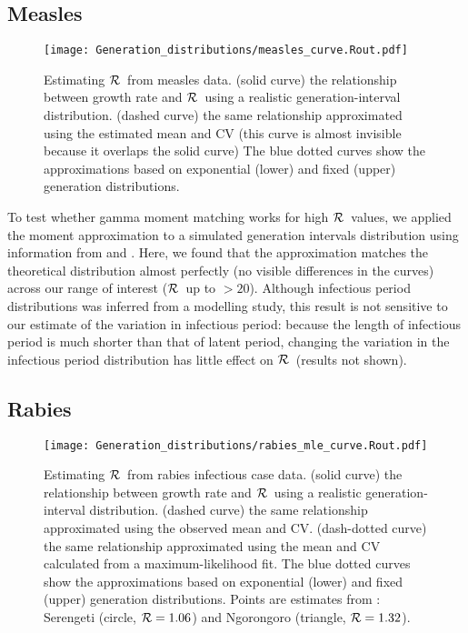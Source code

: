 \documentclass[12pt]{article}
\newcommand{\RR}{\ensuremath{{\cal R}}}
\begin{document}
\subsection{Measles}

\begin{figure}[htbp] \centering
	\texttt{[image: Generation\_distributions/measles\_curve.Rout.pdf]}
	\caption{Estimating \RR~from measles data.
		(solid curve) the relationship between growth rate and \RR~using a realistic generation-interval distribution.
		(dashed curve) the same relationship approximated using the estimated mean and CV (this curve is almost invisible because it overlaps the solid curve)
		The blue dotted curves show the approximations based on exponential (lower) and fixed (upper) generation distributions.
	}
	\label{fig:measlesCurve}
\end{figure}

To test whether gamma moment matching works for high \RR\ values, we applied the moment approximation to a simulated generation intervals distribution using information from \cite{LessReic09} and \cite{Lloy01}. 
Here, we found that the approximation matches the theoretical distribution almost perfectly (no visible differences in the curves) across our range of interest (\RR\ up to $>20$).
Although infectious period distributions was inferred from a modelling study, this result is not sensitive to our estimate of the variation in infectious period: because the length of infectious period is much shorter than that of latent period, changing the variation in the infectious period distribution has little effect on \RR\ (results not shown). 

\subsection{Rabies}

\begin{figure}[htbp] \centering
	\texttt{[image: Generation\_distributions/rabies\_mle\_curve.Rout.pdf]}
	\caption{Estimating \RR~from rabies infectious case data.
		(solid curve) the relationship between growth rate and \RR~using a realistic generation-interval distribution.
		(dashed curve) the same relationship approximated using the observed mean and CV.
		(dash-dotted curve) the same relationship approximated using the mean and CV calculated from a maximum-likelihood fit.
		The blue dotted curves show the approximations based on exponential (lower) and fixed (upper) generation distributions.
		Points are estimates from \cite{HampDush09}:
		Serengeti (circle, $\RR=1.06$) and Ngorongoro (triangle, $\RR=1.32$).
	}
	\label{fig:rabiesCurve}
\end{figure}
\end{document}
